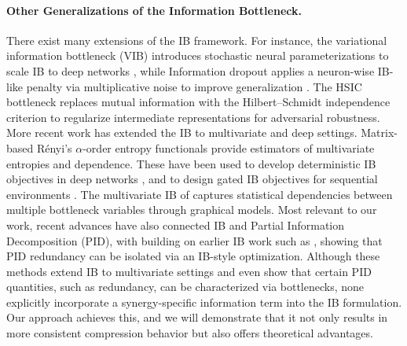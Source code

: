 \documentclass{article}
\theoremstyle{definition}
\theoremstyle{remark}
\begin{document}
\paragraph{Other Generalizations of the Information Bottleneck.}
There exist many extensions of the IB framework. For instance, the variational information bottleneck (VIB) introduces stochastic neural parameterizations to scale IB to deep networks \citep{alemi2017deep}, while Information dropout applies a neuron-wise IB-like penalty via multiplicative noise to improve generalization \citep{achille2017information}. The HSIC bottleneck \citep{wang2021revisiting} replaces mutual information with the Hilbert–Schmidt independence criterion to regularize intermediate representations for adversarial robustness. More recent work has extended the IB to multivariate and deep settings. Matrix-based R\'enyi's $\alpha$-order entropy functionals \citep{yu2019multivariate,yu2021measuring} provide estimators of multivariate entropies and dependence. These have been used to develop deterministic IB objectives in deep networks \citep{yu2021deepdib}, and to design gated IB objectives for sequential environments \citep{alesiani2023gated}. The multivariate IB of \citet{friedman2001multivariate} captures statistical dependencies between multiple bottleneck variables through graphical models. Most relevant to our work, recent advances have also connected IB and Partial Information Decomposition (PID), with \citet{kolchinsky2024redundancy} building on earlier IB work such as \citet{kolchinsky2019nonlinear}, showing that PID redundancy can be isolated via an IB-style optimization. Although these methods extend IB to multivariate settings and even show that certain PID quantities, such as redundancy, can be characterized via bottlenecks, none explicitly incorporate a synergy-specific information term into the IB formulation. Our approach achieves this, and we will demonstrate that it not only results in more consistent compression behavior but also offers theoretical advantages.
\end{document}

